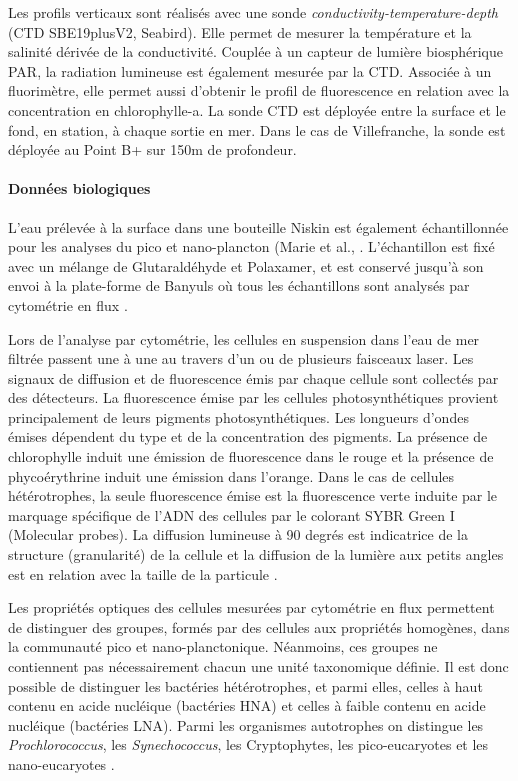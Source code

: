 \documentclass[12pt]{article}
\begin{document}
Les profils verticaux sont réalisés avec une sonde \textit{conductivity-temperature-depth} (CTD SBE19plusV2, Seabird).  Elle permet de mesurer la température et la salinité dérivée de la conductivité. Couplée à un capteur de lumière biosphérique PAR, la radiation lumineuse est également mesurée par la CTD. Associée à un fluorimètre, elle permet aussi d’obtenir le profil de fluorescence en relation avec la concentration en chlorophylle-a. La sonde CTD est déployée entre la surface et le fond, en station, à chaque sortie en mer. Dans le cas de Villefranche, la sonde est déployée au Point B+ sur 150m de profondeur. 


\paragraph{Données biologiques\\}

L’eau prélevée à la surface dans une bouteille Niskin est également échantillonnée pour les analyses du pico et nano-plancton (Marie et al., . L’échantillon est fixé avec un mélange de Glutaraldéhyde et Polaxamer, et est conservé jusqu’à son envoi à la plate-forme de Banyuls où tous les échantillons sont analysés par cytométrie en flux \citep{Marie2014}.

Lors de l’analyse par cytométrie, les cellules en suspension dans l’eau de mer filtrée passent une à une au travers d'un ou de plusieurs faisceaux laser. Les signaux de diffusion et de fluorescence émis par chaque cellule sont collectés par des détecteurs. La fluorescence émise par les cellules photosynthétiques provient principalement de leurs pigments photosynthétiques. Les longueurs d’ondes émises dépendent du type et de la concentration des pigments. La présence de chlorophylle induit une émission de fluorescence dans le rouge et la présence de phycoérythrine induit une émission dans l’orange. Dans le cas de cellules hétérotrophes, la seule fluorescence émise est la fluorescence verte induite par le marquage spécifique de l’ADN des cellules par le colorant SYBR Green I (Molecular probes). La diffusion lumineuse à 90 degrés est indicatrice de la structure (granularité) de la cellule \citep{Trask1982} et la diffusion de la lumière aux petits angles est en relation avec la taille de la particule \citep{Dubelaar2007}.

Les propriétés optiques des cellules mesurées par cytométrie en flux permettent de distinguer des groupes, formés par des cellules aux propriétés homogènes, dans la communauté pico et nano-planctonique. Néanmoins, ces groupes ne contiennent pas nécessairement chacun une unité taxonomique définie. Il est donc possible de distinguer les bactéries hétérotrophes, et parmi elles, celles à haut contenu en acide nucléique (bactéries HNA) et celles à faible contenu en acide nucléique (bactéries LNA). Parmi les organismes autotrophes on distingue les \textit{Prochlorococcus}, les \textit{Synechococcus}, les Cryptophytes, les pico-eucaryotes et les nano-eucaryotes \citep{Marie1999}.
\end{document}
